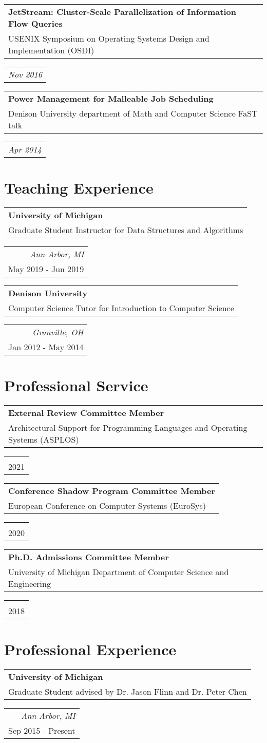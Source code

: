 \documentclass[letterpaper,10pt]{article}
\newcommand{\reitem}[2]{
  \begin{tabular}{l}
    #2
  \end{tabular}
\hfill
\begin{tabular}{r}
  #1
\end{tabular}
}
\newcommand{\quadItem}[4]{\reitem{\emph{#1}\\#2}{\textbf{#3}\\#4}}
\begin{document}
\quadItem{Nov 2016}{}{JetStream: Cluster-Scale Parallelization of Information
  Flow Queries}{USENIX Symposium on Operating Systems Design and
  Implementation (OSDI)}

\quadItem{Apr 2014}{}{Power Management for Malleable Job Scheduling}{Denison
  University department of Math and Computer Science FaST talk}

\section{Teaching Experience}
\quadItem{Ann Arbor, MI}{May 2019 - Jun 2019}{University of Michigan}{Graduate Student Instructor for Data Structures and Algorithms}

\quadItem{Granville, OH}{Jan 2012 - May 2014}{Denison University}{Computer Science Tutor for Introduction to Computer Science}

\section{Professional Service}
\quadItem{}{2021}{External Review Committee Member}{Architectural Support for Programming Languages and Operating Systems (ASPLOS)}

\quadItem{}{2020}{Conference Shadow Program Committee Member}{European Conference on Computer Systems (EuroSys)}

\quadItem{}{2018}{Ph.D. Admissions Committee Member}{University of Michigan Department of Computer Science and Engineering}


\section{Professional Experience}
\quadItem{Ann Arbor, MI}{Sep 2015 - Present}{University of Michigan}{Graduate Student advised by Dr. Jason Flinn and Dr. Peter Chen}
\end{document}
